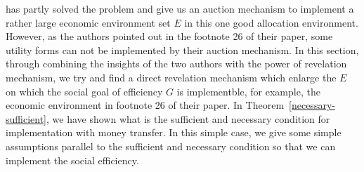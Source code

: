 \parencite{Maskin00} has partly solved the problem and give us an auction mechanism to implement a rather large economic 
environment set $E$ in this one good allocation environment. However, as the authors pointed out in the footnote 26 of 
their paper, some utility forms can not be implemented by their auction mechanism. In this section, through combining the 
insights of the two authors with the power of revelation mechanism, we try and find a direct revelation mechanism  which
enlarge the $E$ on which the social goal of efficiency $G$ is implementble, for example, the economic environment in footnote
26 of their paper.
In Theorem~\ref{necessary-sufficient}, we have shown what is the sufficient and necessary condition for implementation with money 
transfer. In this simple case, we give some simple assumptions parallel to the sufficient and necessary condition
so that we can implement the social efficiency.

